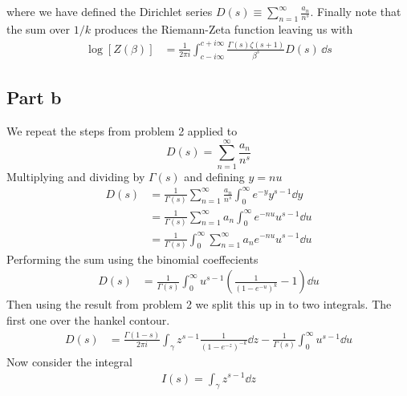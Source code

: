 \documentclass[a4paper,12pt]{article}
\begin{document}
where we have defined the Dirichlet series $D(s)\equiv\sum_{n=1}^{\infty}\frac{a_n}{n^s}$. Finally note that the sum over $1/k$ produces the Riemann-Zeta function leaving us with
\begin{equation}
	\begin{aligned}
		\log [Z(\beta)]
		&=\frac{1}{2\pi i}\int_{c-i\infty}^{c+i\infty}\frac{\Gamma(s)\zeta(s+1)}{\beta^s}D(s)\,\dd s 
	\end{aligned}
\end{equation}
\subsection*{Part b}
We repeat the steps from problem 2 applied to
\begin{equation}
D(s)=\sum_{n=1}^{\infty} \frac{a_n}{n^s}
\end{equation}
Multiplying and dividing by $\Gamma(s)$ and defining $y=nu$
\begin{equation}
	\begin{aligned}
		D(s)&=\frac{1}{\Gamma(s)}\sum_{n=1}^{\infty}\frac{a_n}{n^s}\int_{0}^{\infty}e^{-y}y^{s-1}\dd y\\
		&=\frac{1}{\Gamma(s)}\sum_{n=1}^{\infty}a_n\int_{0}^{\infty}e^{-nu}u^{s-1}\dd u\\
		&=\frac{1}{\Gamma(s)}\int_{0}^{\infty}\sum_{n=1}^{\infty}a_ne^{-nu}u^{s-1}\dd u
	\end{aligned}
\end{equation}
Performing the sum using the binomial coeffecients
\begin{equation}
	\begin{aligned}
		D(s)
		&=\frac{1}{\Gamma(s)}\int_{0}^{\infty}u^{s-1}\left(\frac{1}{\left(1-e^{-u}\right)^k}-1\right)
		\dd u
	\end{aligned}
\end{equation}
Then using the result from problem 2 we split this up in to two integrals. The first one over the hankel contour.
\begin{equation}
	\begin{aligned}
		D(s)
				&=
		\frac{\Gamma(1-s)}{2\pi i}\int_\gamma
		z^{s-1}\frac{1}{(1-e^{-z})^{-k}} \dd z-\frac{1}{\Gamma(s)}\int_{0}^{\infty}u^{s-1}
		\dd u
	\end{aligned}
\end{equation}
Now consider the integral
\begin{equation}
	\begin{aligned}
I(s)=\int_\gamma z^{s-1}
		\dd z
	\end{aligned}
\end{equation}
\end{document}

